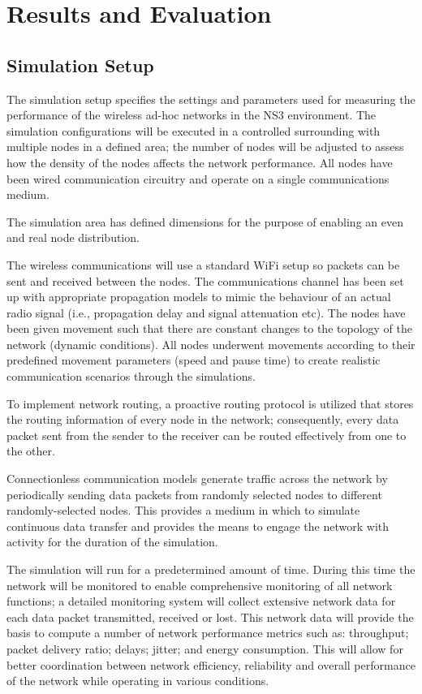 \documentclass[a4paper,fleqn]{cas-dc}
\numberwithin{equation}{section}
\begin{document}
\FloatBarrier
\section{Results and Evaluation}

\subsection{Simulation Setup}

The simulation setup specifies the settings and parameters used for measuring the performance of the wireless ad-hoc networks in the NS3 environment. The simulation configurations will be executed in a controlled surrounding with multiple nodes in a defined area; the number of nodes will be adjusted to assess how the density of the nodes affects the network performance. All nodes have been wired communication circuitry and operate on a single communications medium.

The simulation area has defined dimensions for the purpose of enabling an even and real node distribution.

The wireless communications will use a standard WiFi setup so packets can be sent and received between the nodes. The communications channel has been set up with appropriate propagation models to mimic the behaviour of an actual radio signal (i.e., propagation delay and signal attenuation etc). The nodes have been given movement such that there are constant changes to the topology of the network (dynamic conditions). All nodes underwent movements according to their predefined movement parameters (speed and pause time) to create realistic communication scenarios through the simulations.

To implement network routing, a proactive routing protocol is utilized that stores the routing information of every node in the network; consequently, every data packet sent from the sender to the receiver can be routed effectively from one to the other.

Connectionless communication models generate traffic across the network by periodically sending data packets from randomly selected nodes to different randomly-selected nodes. This provides a medium in which to simulate continuous data transfer and provides the means to engage the network with activity for the duration of the simulation.


The simulation will run for a predetermined amount of time. During this time the network will be monitored to enable comprehensive monitoring of all network functions; a detailed monitoring system will collect extensive network data for each data packet transmitted, received or lost. This network data will provide the basis to compute a number of network performance metrics such as: throughput; packet delivery ratio; delays; jitter; and energy consumption. This will allow for better coordination between network efficiency, reliability and overall performance of the network while operating in various conditions.
\end{document}
